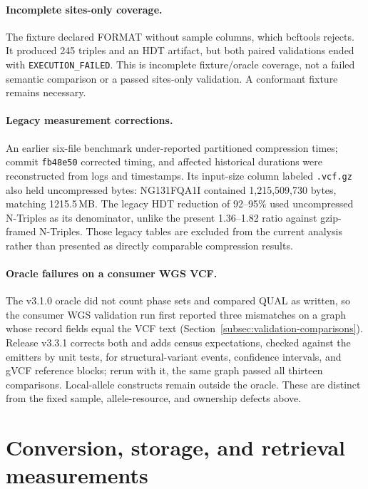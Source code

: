 \documentclass[11pt]{article}
\begin{document}
\paragraph{Incomplete sites-only coverage.}
The fixture declared FORMAT without sample columns, which bcftools rejects.
It produced 245 triples and an HDT artifact, but both paired validations ended with \texttt{EXECUTION\_FAILED}.
This is incomplete fixture/oracle coverage, not a failed semantic comparison or a passed sites-only validation.
A conformant fixture remains necessary.

\paragraph{Legacy measurement corrections.}
An earlier six-file benchmark under-reported partitioned compression times; commit \texttt{fb48e50} corrected timing, and affected historical durations were reconstructed from logs and timestamps.
Its input-size column labeled \texttt{.vcf.gz} also held uncompressed bytes: NG131FQA1I contained 1,215,509,730 bytes, matching 1215.5\,MB.
The legacy HDT reduction of 92--95\% used uncompressed N-Triples as its denominator, unlike the present 1.36--1.82 ratio against gzip-framed N-Triples.
Those legacy tables are excluded from the current analysis rather than presented as directly comparable compression results.

\paragraph{Oracle failures on a consumer WGS VCF.}
The v3.1.0 oracle did not count phase sets and compared QUAL as written, so the consumer WGS validation run first reported three mismatches on a graph whose record fields equal the VCF text (Section~\ref{subsec:validation-comparisons}).
Release v3.3.1 corrects both and adds census expectations, checked against the emitters by unit tests, for structural-variant events, confidence intervals, and gVCF reference blocks; rerun with it, the same graph passed all thirteen comparisons.
Local-allele constructs remain outside the oracle.
These are distinct from the fixed sample, allele-resource, and ownership defects above.

\section{Conversion, storage, and retrieval measurements}\label{sec:measurements}
\end{document}
